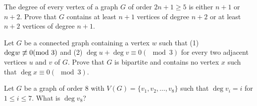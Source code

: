 \begin{exer}
The degree of every vertex of a graph $G$ of order $2n+1 \geq 5$ is either $n+1$ or $n+2$. Prove that $G$ contains at least $n+1$ vertices of degree $n+2$ or at least $n+2$ vertices of degree $n+1$.
\end{exer}

\begin{exer}
Let $G$ be a connected graph containing a vertex $w$ such that (1) $\deg{}{w} \centernot\equiv 0 (\mod{3})$ and (2) $\deg{}{u}+\deg{}{v} \equiv 0 (\mod{3})$ for every two adjacent vertices $u$ and $v$ of $G$. Prove that $G$ is bipartite and contains no vertex $x$ such that $\deg{}{x} \equiv 0 (\mod{3})$.
\end{exer}

\begin{exer}
Let $G$ be a graph of order 8 with $V(G) = \{v_{1},v_{2},\ldots,v_{8}\}$ such that $\deg{}{v_{i}} = i$ for $1 \leq i \leq 7$. What is $\deg{}{v_{8}}$?
\end{exer}